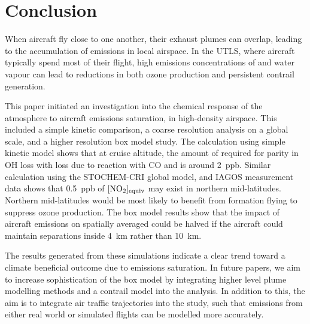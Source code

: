\section{Conclusion}
When aircraft fly close to one another, their exhaust plumes can overlap, leading to the accumulation of emissions in local airspace. In the UTLS, where aircraft typically spend most of their flight, high emissions concentrations of  and water vapour can lead to reductions in both ozone production and persistent contrail generation.

This paper initiated an investigation into the chemical response of the atmosphere to aircraft emissions saturation, in high-density airspace. This included a simple kinetic comparison, a coarse resolution analysis on a global scale, and a higher resolution box model study. The calculation using simple kinetic model shows that at cruise altitude, the amount of  required for parity in OH loss with loss due to reaction with CO and  is around 2~ppb. Similar calculation using the STOCHEM-CRI global model, and IAGOS measurement data shows that 0.5~ppb of ${[\ce{NO2}]_{\mathrm{equiv}}}$ may exist in northern mid-latitudes. Northern mid-latitudes would be most likely to benefit from formation flying to suppress ozone production. The box model results show that the impact of aircraft emissions on spatially averaged  could be halved if the aircraft could maintain separations inside 4~km rather than 10~km.

The results generated from these simulations indicate a clear trend toward a climate beneficial outcome due to emissions saturation. In future papers, we aim to increase sophistication of the box model by integrating higher level plume modelling methods and a contrail model into the analysis. In addition to this, the aim is to integrate air traffic trajectories into the study, such that emissions from either real world or simulated flights can be modelled more accurately.